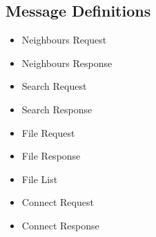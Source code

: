 \subsection{Message Definitions}

\begin{itemize}
  \item{Neighbours Request}
  \item{Neighbours Response}
  \item{Search Request}
  \item{Search Response}
  \item{File Request}
  \item{File Response}
  \item{File List}
  \item{Connect Request}
  \item{Connect Response}
\end{itemize}








